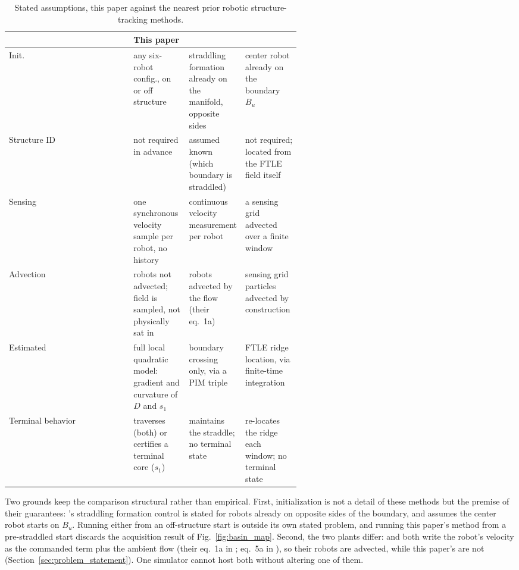 \documentclass[lettersize,journal]{IEEEtran}
\begin{document}
\begin{table}[!t]
\centering
\caption{Stated assumptions, this paper against the nearest prior
robotic structure-tracking methods.}
\label{tab:assumptions}
\scriptsize
\setlength{\tabcolsep}{3pt}
\begin{tabular}{@{}l>{\raggedright\arraybackslash}p{0.19\linewidth}>{\raggedright\arraybackslash}p{0.19\linewidth}>{\raggedright\arraybackslash}p{0.19\linewidth}@{}}
\hline
& \textbf{This paper} & \textbf{\cite{9,10,11}} & \textbf{\cite{13}} \\
\hline
Init. & any six-robot config., on or off structure & straddling formation already on the manifold, opposite sides & center robot already on the boundary $B_u$ \\
Structure ID & not required in advance & assumed known (which boundary is straddled) & not required; located from the FTLE field itself \\
Sensing & one synchronous velocity sample per robot, no history & continuous velocity measurement per robot & a sensing grid advected over a finite window \\
Advection & robots not advected; field is sampled, not physically sat in & robots advected by the flow (their eq.~1a) & sensing grid particles advected by construction \\
Estimated & full local quadratic model: gradient and curvature of $D$ and $s_1$ & boundary crossing only, via a PIM triple & FTLE ridge location, via finite-time integration \\
Terminal behavior & traverses (both) or certifies a terminal core ($s_1$) & maintains the straddle; no terminal state & re-locates the ridge each window; no terminal state \\
\hline
\end{tabular}
\end{table}

Two grounds keep the comparison structural rather than empirical.
First, initialization is not a detail of these methods but the premise
of their guarantees: \cite{9}'s straddling formation control is stated
for robots already on opposite sides of the boundary, and \cite{13}
assumes the center robot starts on $B_u$. Running either from an
off-structure start is outside its own stated problem, and running this
paper's method from a pre-straddled start discards the acquisition
result of Fig.~\ref{fig:basin_map}. Second, the two plants differ:
\cite{9,10,11,12} and \cite{13} both write the robot's velocity as the
commanded term plus the ambient flow (their eq.~1a in \cite{9}; eq.~5a
in \cite{13}), so their robots are advected, while this paper's are
not (Section~\ref{sec:problem_statement}). One simulator cannot host
both without altering one of them.
\end{document}
